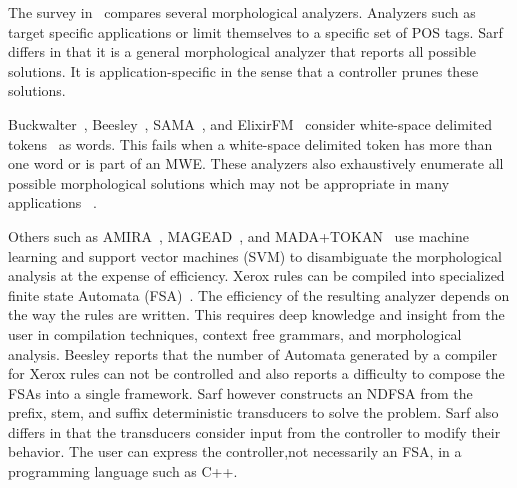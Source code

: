 \documentclass[11pt]{article}
\begin{document}
The survey in~\cite{Sughaiyer:04} compares
several morphological analyzers. 
Analyzers such as~\cite{Khoja:01,Darwish:02} 
target specific applications 
or limit themselves to a specific set of POS tags. 
Sarf differs in that it is a general morphological 
analyzer that reports all possible solutions. 
It is application-specific in the sense that a controller 
prunes these solutions. 

Buckwalter~,
Beesley~,
SAMA~\cite{Kulick:10},
and ElixirFM~\cite{Otakar:07} 
consider white-space delimited tokens~\cite{Kulick:10}
as words.
This fails when a white-space delimited token has
more than one word or is part of an MWE.
These analyzers also exhaustively enumerate all 
possible morphological solutions 
which may not be appropriate in many applications
~\cite{Maamouri:10}. 

Others such as 
AMIRA~\cite{Diab:07,Benajiba:07},
MAGEAD~\cite{Habash:05}, and MADA+TOKAN~\cite{Habash:09} 
use machine learning and support vector machines (SVM) 
to disambiguate the morphological analysis at the expense 
of efficiency.
Xerox rules can be compiled into specialized 
finite state Automata (FSA)~\cite{Beesley:03}.
The efficiency of the resulting analyzer depends on the
way the rules are written. 
This requires deep knowledge and insight from the user
in compilation techniques, context free grammars, 
and morphological analysis.
Beesley reports that the number of Automata generated by a compiler
for Xerox rules can not be controlled and also reports a difficulty 
to compose the FSAs into a single framework. 
Sarf however constructs an NDFSA from 
the prefix, stem, and suffix deterministic 
transducers to solve the problem.
Sarf also differs in that 
the transducers consider
input from the controller to modify their behavior.
The user can express the controller,not necessarily an FSA, in a programming language such as C++.
\end{document}
